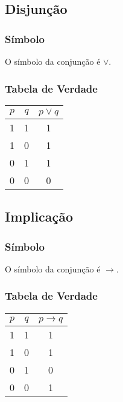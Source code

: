 \subsection{Disjunção}

\subsubsection{Símbolo}
O símbolo da conjunção é $\lor$.

\subsubsection{Tabela de Verdade}
\begin{table}[H]
    \begin{tabular}{|c|c|c|}
        \hline
        $p$ & $q$ & $p \lor q$ \\
        \hline
        1 & 1 & 1 \\
        1 & 0 & 1 \\
        0 & 1 & 1 \\
        0 & 0 & 0 \\
        \hline
    \end{tabular}
\end{table}

\subsection{Implicação}

\subsubsection{Símbolo}
O símbolo da conjunção é $\rightarrow$.

\subsubsection{Tabela de Verdade}
\begin{table}[H]
    \begin{tabular}{|c|c|c|}
        \hline
        $p$ & $q$ & $p \rightarrow q$ \\
        \hline
        1 & 1 & 1 \\
        1 & 0 & 1 \\
        0 & 1 & 0 \\
        0 & 0 & 1 \\
        \hline
    \end{tabular}
\end{table}


